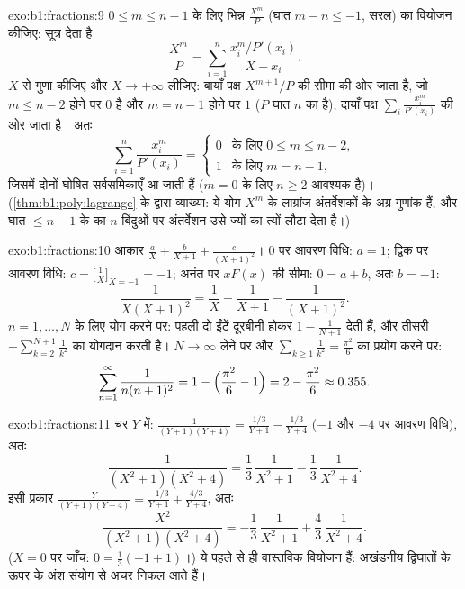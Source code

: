 \begin{solution}{exo:b1:fractions:9}
$0 \leq m \leq n - 1$ के लिए भिन्न $\frac{X^m}{P}$ (घात $m - n \leq -1$,
 सरल) का वियोजन कीजिए:  सूत्र देता है
\[
\frac{X^m}{P} = \sum_{i=1}^{n} \frac{x_i^m / P'(x_i)}{X - x_i} .
\]
$X$ से गुणा कीजिए और $X \to +\infty$ लीजिए: बायाँ पक्ष $X^{m+1}/P$ की सीमा
की ओर जाता है, जो $m \leq n - 2$ होने पर $0$ है और $m = n - 1$ होने पर $1$
($P$ घात $n$ का  है); दायाँ पक्ष $\sum_i \frac{x_i^m}{P'(x_i)}$ की
ओर जाता है। अतः
\[
\sum_{i=1}^{n} \frac{x_i^{m}}{P'(x_i)} =
\begin{cases}
0 & \text{के लिए } 0 \leq m \leq n-2,\\
1 & \text{के लिए } m = n - 1,
\end{cases}
\]
जिसमें दोनों घोषित सर्वसमिकाएँ आ जाती हैं ($m = 0$ के लिए $n \geq 2$ आवश्यक
है)। (\cref{thm:b1:poly:lagrange} के द्वारा व्याख्या: ये योग $X^m$ के
लाग्रांज अंतर्वेशकों के अग्र गुणांक हैं, और घात $\leq n-1$ के  का $n$
बिंदुओं पर अंतर्वेशन उसे ज्यों-का-त्यों लौटा देता है।)
\end{solution}

\begin{solution}{exo:b1:fractions:10}
आकार $\frac aX + \frac b{X+1} + \frac c{(X+1)^2}$। $0$ पर आवरण विधि: $a =
1$; द्विक  पर आवरण विधि: $c = \bigl[\frac1X \bigr]_{X=-1} = -1$; अनंत
पर $xF(x)$ की सीमा: $0 = a + b$, अतः $b = -1$:
\[
\frac{1}{X(X+1)^2} = \frac1X - \frac1{X+1} - \frac1{(X+1)^2} .
\]
$n = 1, \dots, N$ के लिए योग करने पर: पहली दो ईंटें दूरबीनी होकर $1 -
\frac1{N+1}$ देती हैं, और तीसरी $-\sum_{k=2}^{N+1} \frac1{k^2}$ का योगदान
करती है। $N \to \infty$ लेने पर और $\sum_{k\geq1} \frac1{k^2} =
\frac{\pi^2}6$ का प्रयोग करने पर:
\[
\sum_{n=1}^{\infty}\frac{1}{n(n+1)^2}
= 1 - \Bigl(\frac{\pi^2}6 - 1\Bigr) = 2 - \frac{\pi^2}6
\approx 0.355 .
\]
\end{solution}

\begin{solution}{exo:b1:fractions:11}
चर $Y$ में: $\frac1{(Y+1)(Y+4)} = \frac{1/3}{Y+1} - \frac{1/3}{Y+4}$ ($-1$
और $-4$ पर आवरण विधि), अतः
\[
\frac{1}{(X^2+1)(X^2+4)}
= \frac13\,\frac1{X^2+1} - \frac13\,\frac1{X^2+4} .
\]
इसी प्रकार $\frac{Y}{(Y+1)(Y+4)} = \frac{-1/3}{Y+1} + \frac{4/3}{Y+4}$, अतः
\[
\frac{X^2}{(X^2+1)(X^2+4)}
= -\frac13\,\frac1{X^2+1} + \frac43\,\frac1{X^2+4} .
\]
($X = 0$ पर जाँच: $0 = \frac13(-1 + 1)$।) ये पहले से ही वास्तविक वियोजन हैं:
अखंडनीय द्विघातों के ऊपर के अंश संयोग से अचर निकल आते हैं।
\end{solution}

